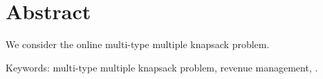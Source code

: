 
\section*{Abstract}
We consider the online multi-type multiple knapsack problem.






Keywords: multi-type multiple knapsack problem, revenue management, .



